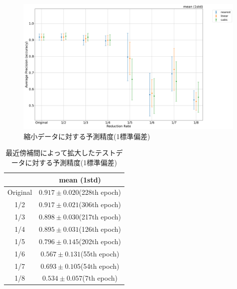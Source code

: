 \documentclass[a4j, 11pt]{jreport}
\begin{document}

\begin{figure}[H]
  \centering
  \includegraphics[width=16cm]{images/5syou/print_errorbar/print_errorbar_inter_comparison/acc_with_errorbar_syuron5_inter_comparison_900epoch_30run_300_acc_max_std1sigma.png}
  \caption{縮小データに対する予測精度(1標準偏差)}
  \label{fig:inter_comparison_300_1std}
\end{figure}

\begin{table}[H]
  \centering
	\caption{最近傍補間によって拡大したテストデータに対する予測精度(1標準偏差)}
  \begin{tabular}{|c|c|}
		\hline
    & mean (1std) \\ \hline
    Original & $0.917 \pm 0.020$(228th epoch) \\ \hline
    1/2 & $0.917 \pm 0.021$(306th epoch) \\ \hline
    1/3 & $0.898 \pm 0.030$(217th epoch) \\ \hline
    1/4 & $0.895 \pm 0.031$(126th epoch) \\ \hline
    1/5 & $0.796 \pm 0.145$(202th epoch) \\ \hline
    1/6 & $0.567 \pm 0.131$(55th epoch) \\ \hline
    1/7 & $0.693 \pm 0.105$(54th epoch) \\ \hline
    1/8 & $0.534 \pm 0.057$(7th epoch) \\ \hline
  \end{tabular}
  \label{tb:accs_4_2_nearest_1std}
\end{table}
\end{document}
